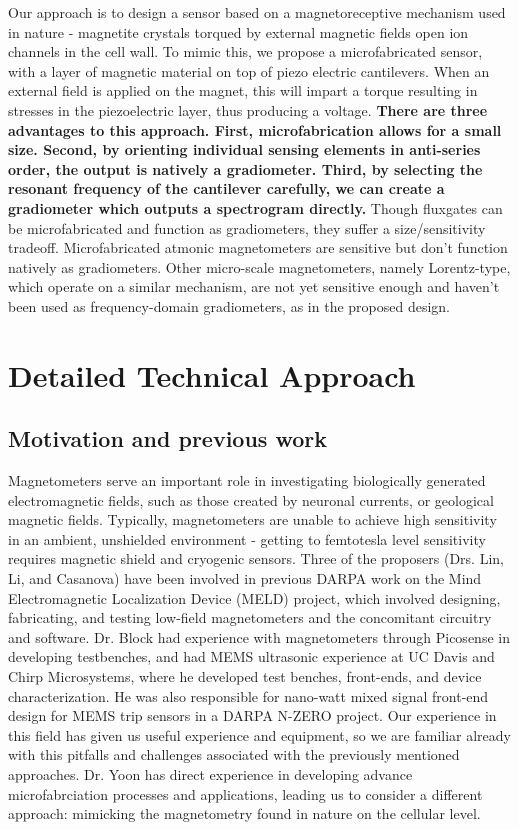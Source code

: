Our approach is to design a sensor based on a magnetoreceptive mechanism used in nature - magnetite crystals torqued by external magnetic fields open ion channels in the cell wall. To mimic this, we propose a microfabricated sensor, with a layer of magnetic material on top of piezo electric cantilevers. When an external field is applied on the magnet, this will impart a torque resulting in stresses in the piezoelectric layer, thus producing a voltage. \textbf{There are three advantages to this approach. First, microfabrication allows for a small size. Second, by orienting individual sensing elements in anti-series order, the output is natively a gradiometer. Third, by selecting the resonant frequency of the cantilever carefully, we can create a gradiometer which outputs a spectrogram directly.} Though fluxgates can be microfabricated and function as gradiometers, they suffer a size/sensitivity tradeoff. Microfabricated atmonic magnetometers are sensitive but don't function natively as gradiometers. Other micro-scale magnetometers, namely Lorentz-type, which operate on a similar mechanism, are not yet sensitive enough and haven't been used as frequency-domain gradiometers, as in the proposed design.

\section{Detailed Technical Approach}

\subsection{Motivation and previous work}

Magnetometers serve an important role in investigating biologically generated electromagnetic fields, such as those created by neuronal currents, or geological magnetic fields. Typically, magnetometers are unable to achieve high sensitivity in an ambient, unshielded environment - getting to femtotesla level sensitivity requires magnetic shield and cryogenic sensors. Three of the proposers (Drs. Lin, Li, and Casanova) have been involved in previous DARPA work on the Mind Electromagnetic Localization Device (MELD) project, which involved designing, fabricating, and testing low-field magnetometers and the concomitant circuitry and software. Dr. Block had experience with magnetometers through Picosense in developing testbenches, and had MEMS ultrasonic experience at UC Davis and Chirp Microsystems, where he developed test benches, front-ends, and device characterization. He was also responsible for nano-watt mixed signal front-end design for MEMS trip sensors in a DARPA N-ZERO project. Our experience in this field has given us useful experience and equipment, so we are familiar already with this pitfalls and challenges associated with the previously mentioned approaches. Dr. Yoon has direct experience in developing advance microfabrciation processes and applications\cite{yoon2003reduced,yoon2006multidirectional}, leading us to consider a different approach: mimicking the magnetometry found in nature on the cellular level.

